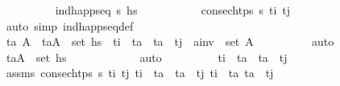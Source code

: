 \begin{isabellebody}
\ \ \ \ \ \ \ \ \isamarkupfalse%
\ {\isacartoucheopen}ind{\isacharunderscore}{\kern0pt}happ{\isacharunderscore}{\kern0pt}seq\ {\isasympi}s\ hs\ \isanewline
\ \ \ \ \ \ \ \ \isamarkupfalse%
\ {\isacartoucheopen}consec{\isacharunderscore}{\kern0pt}htps\ {\isasympi}s\ t\isactrlsub i{\isacharprime}{\kern0pt}\ t\isactrlsub j{\isacharprime}{\kern0pt}{\isacartoucheclose}\ {}\ \isamarkupfalse%
\ {\isacharparenleft}{\kern0pt}auto\ simp{\isacharcolon}{\kern0pt}\ ind{\isacharunderscore}{\kern0pt}happ{\isacharunderscore}{\kern0pt}seq{\isacharunderscore}{\kern0pt}def{\isacharparenright}{\kern0pt}\isanewline
\ \ \ \ \ \ \isamarkupfalse%
\ \isamarkupfalse%
\ t\isactrlsub a{\isacharprime}{\kern0pt}\ A{\isacharprime}{\kern0pt}\ \ {\isachardoublequoteopen}{\isacharparenleft}{\kern0pt}t\isactrlsub a{\isacharprime}{\kern0pt}{\isacharcomma}{\kern0pt}A{\isacharprime}{\kern0pt}{\isacharparenright}{\kern0pt}\ {\isasymin}\ set\ hs\ \ {\isachardoublequoteopen}t\isactrlsub i{\isacharprime}{\kern0pt}\ {\isacharless}{\kern0pt}\ t\isactrlsub a{\isacharprime}{\kern0pt}\ {\isasymand}\ t\isactrlsub a{\isacharprime}{\kern0pt}\ {\isacharless}{\kern0pt}\ t\isactrlsub j{\isacharprime}{\kern0pt}{\isachardoublequoteclose}\ \ {\isachardoublequoteopen}{\isacharquery}{\kern0pt}a\isactrlsub i\isactrlsub n\isactrlsub v\ {\isasymin}\ set\ A{\isacharprime}{\kern0pt}{\isachardoublequoteclose}\isanewline
\ \ \ \ \ \ \ \ \isamarkupfalse%
\ auto\isanewline
\ \ \ \ \ \ \isamarkupfalse%
\ \isamarkupfalse%
\ {\isachardoublequoteopen}{\isacharparenleft}{\kern0pt}t\isactrlsub a{\isacharprime}{\kern0pt}{\isacharcomma}{\kern0pt}A{\isacharprime}{\kern0pt}{\isacharparenright}{\kern0pt}\ {\isasymin}\ set\ hs\isanewline
\ \ \ \ \ \ \ \ \isamarkupfalse%
\ {}\ \isamarkupfalse%
\ auto\isanewline
\ \ \ \ \ \ \isamarkupfalse%
\ \isamarkupfalse%
\ {\isachardoublequoteopen}t\isactrlsub i\ {\isacharless}{\kern0pt}\ t\isactrlsub a{\isacharprime}{\kern0pt}\ {\isasymand}\ t\isactrlsub a{\isacharprime}{\kern0pt}\ {\isacharless}{\kern0pt}\ t\isactrlsub j{\isachardoublequoteclose}\isanewline
\ \ \ \ \ \ \ \ \isamarkupfalse%
\ assms\ {\isacartoucheopen}consec{\isacharunderscore}{\kern0pt}htps\ {\isasympi}s\ t\isactrlsub i{\isacharprime}{\kern0pt}\ t\isactrlsub j{\isacharprime}{\kern0pt}{\isacartoucheclose}\ {\isacartoucheopen}t\isactrlsub i\ {\isacharless}{\kern0pt}\ t\isactrlsub a\ {\isasymand}\ t\isactrlsub a\ {\isacharless}{\kern0pt}\ t\isactrlsub j{\isacartoucheclose}\ {\isacartoucheopen}t\isactrlsub i{\isacharprime}{\kern0pt}\ {\isacharless}{\kern0pt}\ t\isactrlsub a{\isacartoucheclose}\ {\isacartoucheopen}t\isactrlsub a\ {\isacharless}{\kern0pt}\ t\isactrlsub j{\isacharprime}{\kern0pt}{\isacartoucheclose}\ \isanewline

\end{isabellebody}
